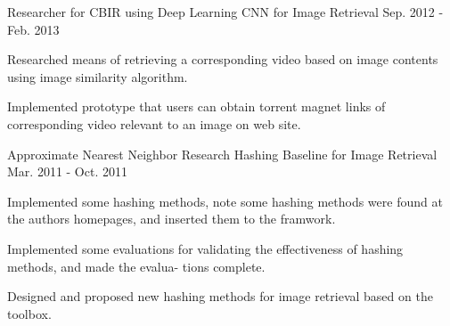 

\begin{cventries}

  \cventry
    {Researcher for CBIR using Deep Learning} %
    {CNN for Image Retrieval} %
    {} %
    {Sep. 2012 - Feb. 2013} %
    {
      \begin{cvitems} %
        \item {Researched means of retrieving a corresponding video based on image contents using image similarity algorithm.}
        \item {Implemented prototype that users can obtain torrent magnet links of corresponding video relevant to an image on web site.}
      \end{cvitems}
    }

  \cventry
    {Approximate Nearest Neighbor Research} %
    {Hashing Baseline for Image Retrieval} %
    {} %
    {Mar. 2011 - Oct. 2011} %
    {
      \begin{cvitems} %
        \item {Implemented some hashing methods, note some hashing methods were found at the authors homepages, and inserted them to the framwork.}
        \item {Implemented some evaluations for validating the effectiveness of hashing methods, and made the evalua- tions complete.}
        \item {Designed and proposed new hashing methods for image retrieval based on the toolbox.}
      \end{cvitems}
    }


\end{cventries}
